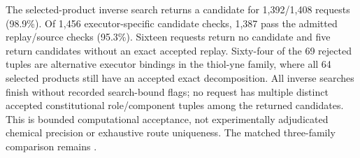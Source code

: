 The selected-product inverse search returns a candidate for 1,392/1,408 requests (98.9\%). Of
1,456 executor-specific candidate checks, 1,387 pass the admitted replay/source checks (95.3\%).
Sixteen requests return no candidate and five return candidates without an exact accepted replay.
Sixty-four of the 69 rejected tuples are alternative executor bindings in the thiol-yne family,
where all 64 selected products still have an accepted exact decomposition.
All inverse searches finish without recorded search-bound flags; no request has multiple distinct
accepted constitutional role/component tuples among the returned candidates. This is bounded
computational acceptance, not experimentally adjudicated chemical precision or exhaustive route
uniqueness. The matched three-family comparison remains
.

